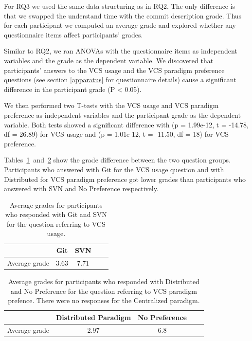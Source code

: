 \documentclass[letterpaper]{article}
\begin{document}
For RQ3 we used the same data structuring as in RQ2.
The only difference is that we swapped the understand time with the commit description grade.
Thus for each participant we computed an average grade and explored whether any questionnaire items affect participants' grades.


Similar to RQ2, we ran ANOVAs with the questionnaire items as independent variables and the grade as the dependent variable. 
We discovered that participants' answers to the VCS usage and the VCS paradigm preference questions (see section \ref{apparatus} for questionnaire details) cause a significant difference in the participant grade (P \textless{} 0.05).

We then performed two T-tests with the VCS usage and VCS paradigm preference as independent variables and the participant grade as the dependent variable.
Both tests showed a significant difference with (p = 1.99e-12, t = -14.78, df = 26.89) for VCS usage and (p = 1.01e-12, t = -11.50, df = 18) for VCS preference.

Tables~\ref{tab:rq3_vcsUsage}~and~\ref{tab:rq3_vcsPreference} show the grade difference between the two question groups.
Participants who answered with Git for the VCS usage question and with Distributed for VCS paradigm preference got lower grades than participants who answered with SVN and No Preference respectively.

\begin{table}[H]
	\centering
	\begin{tabular}{c | c c c c}
										& Git  & SVN \\ \hline
	Average grade & 3.63 & 7.71
	\end{tabular}
	\caption{Average grades for participants who responded with Git and SVN for the question referring to VCS usage.}
	\label{tab:rq3_vcsUsage}
\end{table}

\begin{table}[H]
	\centering
	\begin{tabular}{c | c c c c}
							& Distributed Paradigm  & No Preference \\ \hline
	Average grade & 2.97 & 6.8 
	\end{tabular}
	\caption{Average grades for participants who responded with Distributed and No Preference for the question referring to VCS paradigm prefence. There were no responses for the Centralized paradigm.}
	\label{tab:rq3_vcsPreference}
\end{table}
\end{document}
